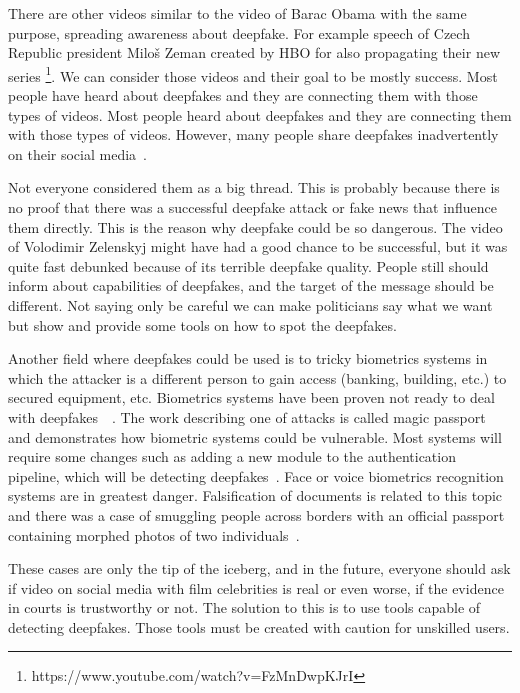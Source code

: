 There are other videos similar to the video of Barac Obama with the same purpose, spreading awareness about deepfake. For example speech of Czech Republic president Miloš Zeman created by HBO for also propagating their new series \footnote{ https://www.youtube.com/watch?v=FzMnDwpKJrI }. We can consider those videos and their goal to be mostly success. Most people have heard about deepfakes and they are connecting them with those types of videos. Most people heard about deepfakes and they are connecting them with those types of videos. However, many people share deepfakes inadvertently on their social media~\cite{DeepfakeSharing}.

Not everyone considered them as a big thread. This is probably because there is no proof that there was a successful deepfake attack or fake news that influence them directly. This is the reason why deepfake could be so dangerous. The video of Volodimir Zelenskyj might have had a good chance to be successful, but it was quite fast debunked because of its terrible deepfake quality. People still should inform about capabilities of deepfakes, and the target of the message should be different. Not saying only be careful we can make politicians say what we want but show and provide some tools on how to spot the deepfakes.

Another field where deepfakes could be used is to tricky biometrics systems in which the attacker is a different person to gain access (banking, building, etc.) to secured equipment, etc. Biometrics systems have been proven not ready to deal with deepfakes~\cite{DawnOfTextDependentSociety}~\cite{TheMagicPassport}. The work describing one of attacks is called magic passport and demonstrates how biometric systems could be vulnerable. Most systems will require some changes such as adding a new module to the authentication pipeline, which will be detecting deepfakes~\cite{DigitalFaceManipulation}. Face or voice biometrics recognition systems are in greatest danger. Falsification of documents is related to this topic and there was a case of smuggling people across borders with an official passport containing morphed photos of two individuals~\cite{FaceMorphingAttackDetectionMethods}.

These cases are only the tip of the iceberg, and in the future, everyone should ask if video on social media with film celebrities is real or even worse, if the evidence in courts is trustworthy or not. The solution to this is to use tools capable of detecting deepfakes. Those tools must be created with caution for unskilled users.

